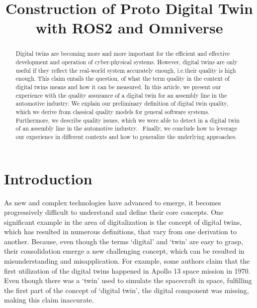 \documentclass[conference]{IEEEtran}
\begin{document}
    \title{Construction of Proto Digital Twin with ROS2 and Omniverse}
    \author{ 
    \and 
    }
   
    \maketitle

    \begin{abstract}
        Digital twins are becoming more and more important for the efficient and effective development and operation of cyber-physical systems.
        However, digital twins are only useful if they reflect the real-world system accurately enough, i.e.their quality is high enough. 
        This claim entails the question, of what the term quality in the context of digital twins means and how it can be measured. 
        In this article, we present our experience with the quality assurance of a digital twin for an assembly line in the automotive industry.
        We explain our preliminary definition of digital twin quality, which we derive from classical quality models for general software systems. 
        Furthermore, we describe quality issues, which we were able to detect in a digital twin of an assembly line in the automotive industry. \
        Finally, we conclude how to leverage our experience in different contexts and how to generalize the underlying approaches.
    \end{abstract}

    \section{Introduction}\label{section:introduction}
    As new and complex technologies have advanced to emerge, it becomes progressively 
    difficult to understand and define their core concepts. One significant example in the 
    area of digitalization is the concept of digital twins, which has resulted in numerous definitions, that vary 
    from one derivation to another. Because, even though the terms `digital' and `twin' are easy to grasp,  their 
    consolidation emerge a new challenging concept, which can be resulted in misunderstanding and misapplication. For example, 
    some authors claim that the first utilization of the digital twins 
    happened in Apollo 13 space mission in 1970. Even though there was a `twin' used to simulate the spacecraft in space, fulfilling the first part of the concept of 
    `digital twin', the digital component was missing, making this claim inaccurate.
    
\end{document}
